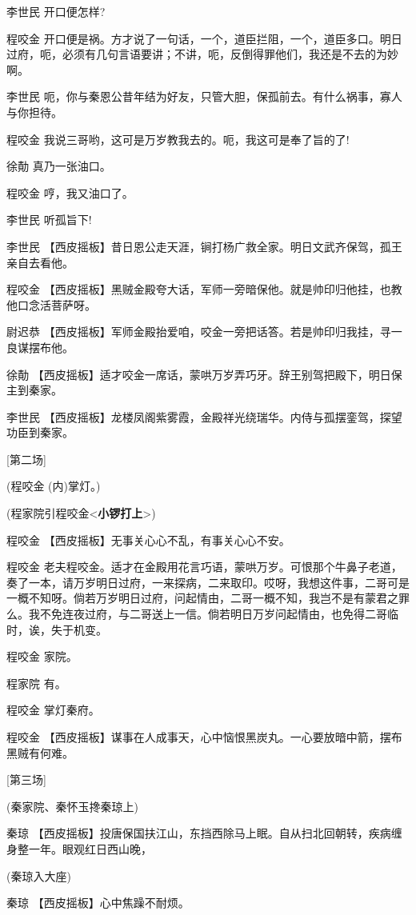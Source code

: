 李世民 开口便怎样?

程咬金
开口便是祸。方才说了一句话，一个，道臣拦阻，一个，道臣多口。明日过府，呃，必须有几句言语要讲；不讲，呃，反倒得罪他们，我还是不去的为妙啊。

李世民
呃，你与秦恩公昔年结为好友，只管大胆，保孤前去。有什么祸事，寡人与你担待。

程咬金 我说三哥哟，这可是万岁教我去的。呃，我这可是奉了旨的了!

徐勣 真乃一张油口。

程咬金 哼，我又油口了。

李世民 听孤旨下!

李世民
【西皮摇板】昔日恩公走天涯，锏打杨广救全家。明日文武齐保驾，孤王亲自去看他。

程咬金
【西皮摇板】黑贼金殿夸大话，军师一旁暗保他。就是帅印归他挂，也教他口念活菩萨呀。

尉迟恭
【西皮摇板】军师金殿抬爱咱，咬金一旁把话答。若是帅印归我挂，寻一良谋摆布他。

徐勣
【西皮摇板】适才咬金一席话，蒙哄万岁弄巧牙。辞王别驾把殿下，明日保主到秦家。

李世民
【西皮摇板】龙楼凤阁紫雾霞，金殿祥光绕瑞华。内侍与孤摆銮驾，探望功臣到秦家。

{[}第二场{]}

(程咬金 (内)掌灯。)

(程家院引程咬金\textless{}\textbf{小锣打上}\textgreater{})

程咬金 【西皮摇板】无事关心心不乱，有事关心心不安。

程咬金
老夫程咬金。适才在金殿用花言巧语，蒙哄万岁。可恨那个牛鼻子老道，奏了一本，请万岁明日过府，一来探病，二来取印。哎呀，我想这件事，二哥可是一概不知呀。倘若万岁明日过府，问起情由，二哥一概不知，我岂不是有蒙君之罪么。我不免连夜过府，与二哥送上一信。倘若明日万岁问起情由，也免得二哥临时，诶，失于机变。

程咬金 家院。

程家院 有。

程咬金 掌灯秦府。

程咬金
【西皮摇板】谋事在人成事天，心中恼恨黑炭丸。一心要放暗中箭，摆布黑贼有何难。

{[}第三场{]}

(秦家院、秦怀玉搀秦琼上)

秦琼
【西皮摇板】投唐保国扶江山，东挡西除马上眠。自从扫北回朝转，疾病缠身整一年。眼观红日西山晚，

(秦琼入大座)

秦琼 【西皮摇板】心中焦躁不耐烦。

